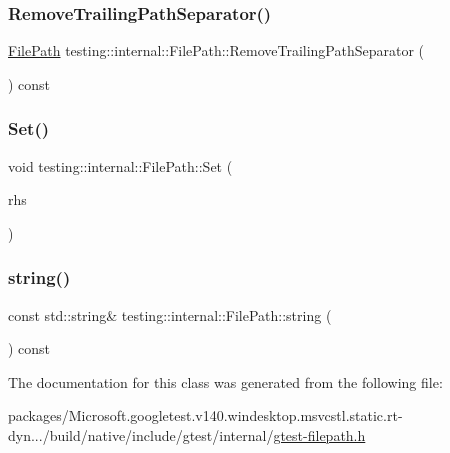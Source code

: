 \mbox{\label{classtesting_1_1internal_1_1_file_path_ab47ada111cc940cf2359f6533bada6ca}} 
\subsubsection{\texorpdfstring{RemoveTrailingPathSeparator()}{RemoveTrailingPathSeparator()}}
{\footnotesize\ttfamily \mbox{\hyperlink{classtesting_1_1internal_1_1_file_path}{File\+Path}} testing\+::internal\+::\+File\+Path\+::\+Remove\+Trailing\+Path\+Separator (\begin{DoxyParamCaption}{ }\end{DoxyParamCaption}) const}

\mbox{\label{classtesting_1_1internal_1_1_file_path_a15a42de7518e89254e0640dd9317d5f7}} 
\subsubsection{\texorpdfstring{Set()}{Set()}}
{\footnotesize\ttfamily void testing\+::internal\+::\+File\+Path\+::\+Set (\begin{DoxyParamCaption}\item[{const \mbox{\hyperlink{classtesting_1_1internal_1_1_file_path}{File\+Path}} \&}]{rhs }\end{DoxyParamCaption})\hspace{0.3cm}{\ttfamily [inline]}}

\mbox{\label{classtesting_1_1internal_1_1_file_path_ab1d58734f2e179264eb6353fea57361d}} 
\subsubsection{\texorpdfstring{string()}{string()}}
{\footnotesize\ttfamily const std\+::string\& testing\+::internal\+::\+File\+Path\+::string (\begin{DoxyParamCaption}{ }\end{DoxyParamCaption}) const\hspace{0.3cm}{\ttfamily [inline]}}



The documentation for this class was generated from the following file\+:\begin{DoxyCompactItemize}
\item 
packages/\+Microsoft.\+googletest.\+v140.\+windesktop.\+msvcstl.\+static.\+rt-\/dyn.../build/native/include/gtest/internal/\mbox{\hyperlink{gtest-filepath_8h}{gtest-\/filepath.\+h}}\end{DoxyCompactItemize}
